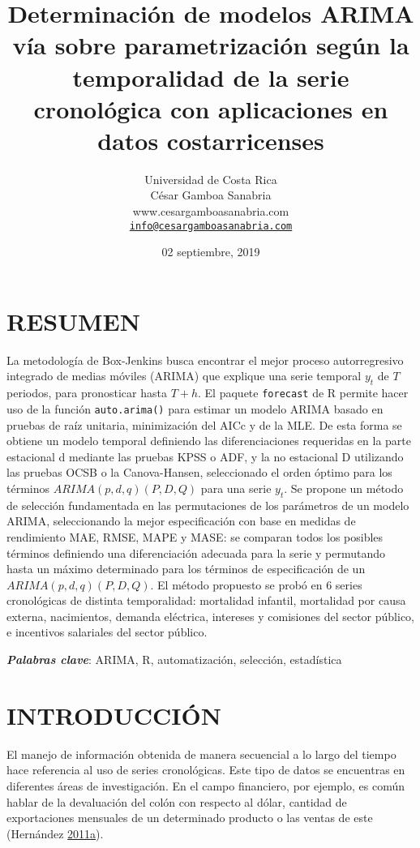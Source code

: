\documentclass[12pt]{article}
\title{Determinación de modelos ARIMA vía sobre parametrización según la
temporalidad de la serie cronológica con aplicaciones en datos
costarricenses}
\author{Universidad de Costa Rica\\
César Gamboa Sanabria\\
www.cesargamboasanabria.com\\
\href{mailto:info@cesargamboasanabria.com}{\nolinkurl{info@cesargamboasanabria.com}}}
\date{02 septiembre, 2019}
\begin{document}
\maketitle

\newpage

\section*{RESUMEN}

La metodología de Box-Jenkins busca encontrar el mejor proceso
autorregresivo integrado de medias móviles (ARIMA) que explique una
serie temporal \(y_t\) de \(T\) periodos, para pronosticar hasta
\(T+h\). El paquete \texttt{forecast} de R permite hacer uso de la
función \texttt{auto.arima()} para estimar un modelo ARIMA basado en
pruebas de raíz unitaria, minimización del AICc y de la MLE. De esta
forma se obtiene un modelo temporal definiendo las diferenciaciones
requeridas en la parte estacional d mediante las pruebas KPSS o ADF, y
la no estacional D utilizando las pruebas OCSB o la Canova-Hansen,
seleccionado el orden óptimo para los términos \(ARIMA(p,d,q)(P,D,Q)\)
para una serie \(y_t\). Se propone un método de selección fundamentada
en las permutaciones de los parámetros de un modelo ARIMA, seleccionando
la mejor especificación con base en medidas de rendimiento MAE, RMSE,
MAPE y MASE: se comparan todos los posibles términos definiendo una
diferenciación adecuada para la serie y permutando hasta un máximo
determinado para los términos de especificación de un
\(ARIMA(p,d,q)(P,D,Q)\). El método propuesto se probó en 6 series
cronológicas de distinta temporalidad: mortalidad infantil, mortalidad
por causa externa, nacimientos, demanda eléctrica, intereses y
comisiones del sector público, e incentivos salariales del sector
público.

\textbf{\emph{Palabras clave}}: ARIMA, R, automatización, selección,
estadística

\newpage

\tableofcontents

\newpage

\section{INTRODUCCIÓN}

El manejo de información obtenida de manera secuencial a lo largo del
tiempo hace referencia al uso de series cronológicas. Este tipo de datos
se encuentras en diferentes áreas de investigación. En el campo
financiero, por ejemplo, es común hablar de la devaluación del colón con
respecto al dólar, cantidad de exportaciones mensuales de un determinado
producto o las ventas de este (Hernández
\protect\hyperlink{ref-oscarh-1}{2011}\protect\hyperlink{ref-oscarh-1}{a}).
\end{document}
